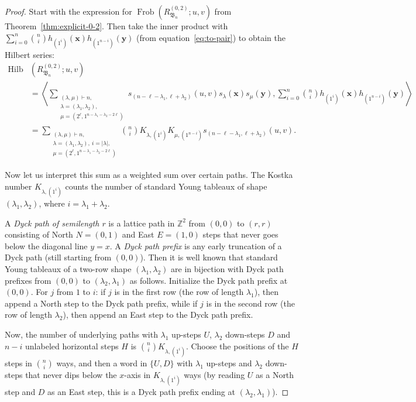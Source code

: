 \documentclass[12pt]{amsart}
\theoremstyle{plain}
\theoremstyle{definition}
\DeclareMathOperator{\Frob}{Frob}
\DeclareMathOperator{\Hilb}{Hilb}
\newcommand{\Z}{\mathbb{Z}}
\newcommand{\x}{\mathbf{x}}
\newcommand{\y}{\mathbf{y}}
\begin{document}
\begin{proof}
Start with the expression for $\Frob(R_{\mathfrak{B}_n}^{(0,2)};u,v)$ from Theorem~\ref{thm:explicit-0-2}. Then take the inner product with $\sum_{i=0}^n \binom{n}{i} h_{(1^i)}(\x)  h_{(1^{n-i})}(\y)$ (from equation~\eqref{eq:to-pair}) to obtain the Hilbert series:
\begin{equation}\label{eq:Hilbert-Kostka}
\begin{aligned}
    \Hilb&(R_{\mathfrak{B}_n}^{(0,2)};u,v)\\ 
    &= \left\langle \!\sum_{\substack{(\lambda, \mu)\vdash n,\\ \lambda = (\lambda_1,\lambda_2),\\ \mu = (2^\ell, 1^{n-\lambda_1-\lambda_2-2\ell}) }} \!s_{(n-\ell-\lambda_1, \ell+\lambda_2)}(u,v)s_{\lambda}(\x) s_{\mu}(\y), \sum_{i=0}^n \binom{n}{i} h_{(1^i)}(\x)  h_{(1^{n-i})}(\y) \right\rangle\\
    &= \sum_{\substack{(\lambda, \mu)\vdash n,\\ \lambda = (\lambda_1,\lambda_2),\ i =|\lambda|,\\ \mu = (2^\ell, 1^{n-\lambda_1-\lambda_2-2\ell})}} \!\binom{n}{i} K_{\lambda, (1^i)} K_{\mu, (1^{n-i})}s_{(n-\ell-\lambda_1,\ell+\lambda_2)}(u,v).
\end{aligned}
\end{equation}

Now let us interpret this sum as a weighted sum over certain paths. The Kostka number 
$K_{\lambda, (1^i)}$ counts the number of standard Young tableaux of shape $(\lambda_1,\lambda_2)$, where $i = \lambda_1 + \lambda_2$.

A \textit{Dyck path of semilength $r$} is a lattice path in $\Z^2$ from $(0,0)$ to $(r,r)$ consisting of North $N=(0,1)$ and East $E = (1,0)$ steps that never goes below the diagonal line $y=x$.
A \textit{Dyck path prefix} is any early truncation of a Dyck path (still starting from $(0,0)$). 
Then it is well known that standard Young tableaux of a two-row shape $(\lambda_1,\lambda_2)$ are in bijection with Dyck path prefixes from $(0,0)$ to $(\lambda_2,\lambda_1)$ as follows. 
Initialize the Dyck path prefix at $(0,0)$. For $j$ from $1$ to $i$: if $j$ is in the first row (the row of length $\lambda_1$), then append a North step to the Dyck path prefix, while if $j$ is in the second row (the row of length $\lambda_2$), then append an East step to the Dyck path prefix.

Now, the number of underlying paths with $\lambda_1$ up-steps $U$, $\lambda_2$ down-steps $D$ and $n-i$ unlabeled horizontal steps $H$ is $\binom{n}{i}K_{\lambda,(1^i)}$. 
Choose the positions of the $H$ steps in $\binom{n}{i}$ ways, and then a word in $\{U,D\}$ with $\lambda_1$ up-steps and $\lambda_2$ down-steps that never dips below the $x$-axis in $K_{\lambda,(1^i)}$ ways (by reading $U$ as a North step and $D$ as an East step, this is a Dyck path prefix ending at $(\lambda_2,\lambda_1)$).


\end{proof}
\end{document}
